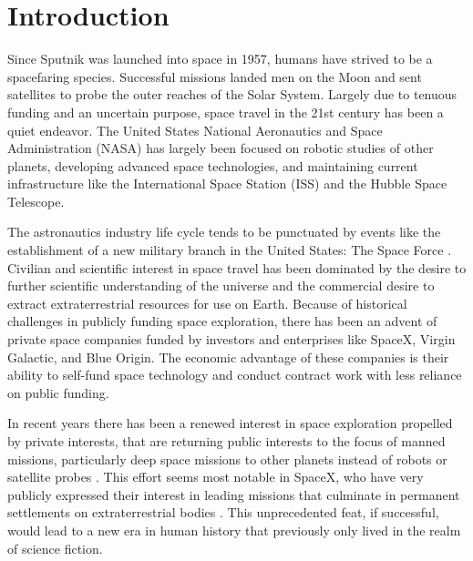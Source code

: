 \section{Introduction}

Since Sputnik was launched into space in 1957, humans have strived to be a spacefaring species.  Successful missions landed men on the Moon and sent satellites to probe the outer reaches of the Solar System. Largely due to tenuous funding and an uncertain purpose, space travel in the 21st century has been a quiet endeavor. The United States National Aeronautics and Space Administration (NASA) has largely been focused on robotic studies of other planets, developing advanced space technologies, and maintaining current infrastructure like the International Space Station (ISS) and the Hubble Space Telescope.

The astronautics industry life cycle tends to be punctuated by events like the establishment of a new military branch in the United States: The Space Force \cite{space-force}. Civilian and scientific interest in space travel has been dominated by the desire to further scientific understanding of the universe and the commercial desire to extract extraterrestrial resources for use on Earth. Because of historical challenges in publicly funding space exploration, there has been an advent of private space companies funded by investors and enterprises like SpaceX, Virgin Galactic, and Blue Origin. The economic advantage of these companies is their ability to self-fund space technology and conduct contract work \cite{space-contract} with less reliance on public funding.

In recent years there has been a renewed interest in space exploration propelled by private interests, that are returning public interests to the focus of manned missions, particularly deep space missions to other planets instead of robots or satellite probes \cite{nasa-landers}. This effort seems most notable in SpaceX, who have very publicly expressed their interest in leading missions that culminate in permanent settlements on extraterrestrial bodies \cite{spacex-mars-press}. This unprecedented feat, if successful, would lead to a new era in human history that previously only lived in the realm of science fiction.

